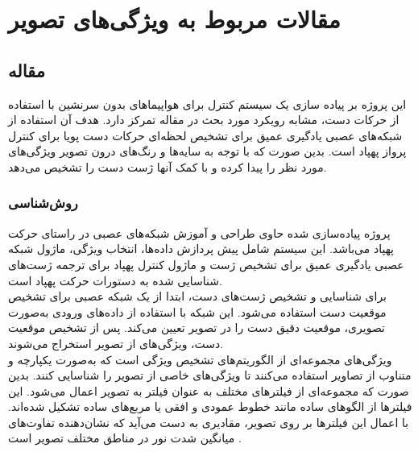 \section{مقالات مربوط به ویژگی‌های تصویر}


\subsection{مقاله }
این پروژه بر پیاده سازی یک سیستم کنترل برای هواپیماهای بدون سرنشین با استفاده از حرکات دست، مشابه رویکرد مورد بحث در مقاله تمرکز دارد. هدف آن استفاده از شبکه‌های عصبی یادگیری عمیق برای تشخیص لحظه‌ای حرکات دست پویا برای کنترل پرواز پهپاد است.
بدین صورت که با توجه به سایه‌ها و رنگ‌های درون تصویر ویژگی‌های  مورد نظر را پیدا کرده و با کمک آنها ژست دست را تشخیص می‌دهد.
\subsubsection{روش‌شناسی}
پروژه پیاده‌سازی شده حاوی طراحی و آموزش شبکه‌های عصبی در راستای حرکت پهپاد می‌باشد. این سیستم شامل پیش پردازش داده‌ها، انتخاب ویژگی، ماژول شبکه عصبی یادگیری عمیق برای تشخیص ژست و ماژول کنترل پهپاد برای ترجمه ژست‌های شناسایی شده به دستورات حرکت پهپاد است.
\\
برای شناسایی و تشخیص ژست‌های دست، ابتدا از یک شبکه عصبی برای تشخیص موقعیت دست استفاده می‌شود. این شبکه با استفاده از داده‌های ورودی به‌صورت تصویری، موقعیت دقیق دست را در تصویر تعیین می‌کند. پس از تشخیص موقعیت دست، ویژگی‌های   از تصویر استخراج می‌شوند.
\\
ویژگی‌های  مجموعه‌ای از الگوریتم‌های تشخیص ویژگی است که به‌صورت یکپارچه و متناوب از تصاویر استفاده می‌کنند تا ویژگی‌های خاصی از تصویر را شناسایی کنند. بدین صورت که مجموعه‌ای از فیلترهای مختلف به عنوان فیلتر  به تصویر اعمال می‌شود. این فیلترها از الگوهای ساده مانند خطوط عمودی و افقی یا مربع‌های ساده تشکیل شده‌اند. با اعمال این فیلترها بر روی تصویر، مقادیری به دست می‌آید که نشان‌دهنده تفاوت‌های میانگین شدت نور در مناطق مختلف تصویر است .


